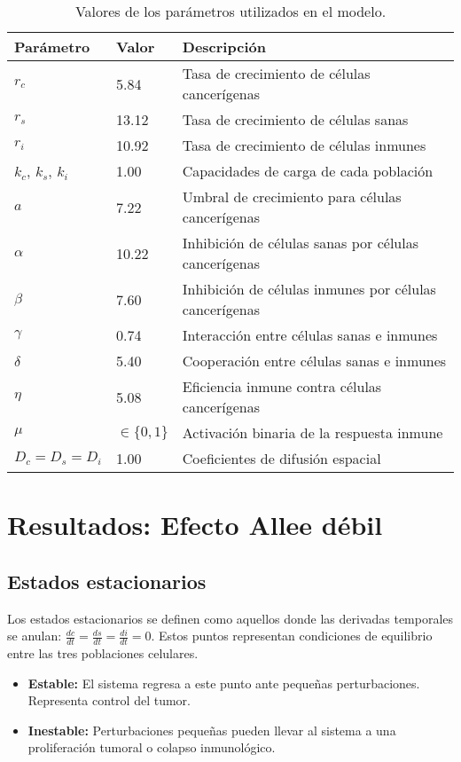 \documentclass{article}
\begin{document}
\begin{table}[H]
\centering
\begin{tabular}{lll}
\toprule
\textbf{Parámetro} & \textbf{Valor} & \textbf{Descripción} \\
\midrule
$r_c$ & 5.84 & Tasa de crecimiento de células cancerígenas \\
$r_s$ & 13.12 & Tasa de crecimiento de células sanas \\
$r_i$ & 10.92 & Tasa de crecimiento de células inmunes \\
$k_c$, $k_s$, $k_i$ & 1.00 & Capacidades de carga de cada población \\
$a$ & 7.22 & Umbral de crecimiento para células cancerígenas \\
$\alpha$ & 10.22 & Inhibición de células sanas por células cancerígenas \\
$\beta$ & 7.60 & Inhibición de células inmunes por células cancerígenas \\
$\gamma$ & 0.74 & Interacción entre células sanas e inmunes \\
$\delta$ & 5.40 & Cooperación entre células sanas e inmunes \\
$\eta$ & 5.08 & Eficiencia inmune contra células cancerígenas \\
$\mu$ & $\in \{0, 1\}$ & Activación binaria de la respuesta inmune \\
$D_c = D_s = D_i$ & 1.00 & Coeficientes de difusión espacial \\
\bottomrule
\end{tabular}
\caption{Valores de los parámetros utilizados en el modelo.}
\end{table}

\section{Resultados: Efecto Allee débil}

\subsection{Estados estacionarios}

Los estados estacionarios se definen como aquellos donde las derivadas temporales se anulan: $\frac{dc}{dt} = \frac{ds}{dt} = \frac{di}{dt} = 0$. Estos puntos representan condiciones de equilibrio entre las tres poblaciones celulares.

\begin{itemize}
\item \textbf{Estable:} El sistema regresa a este punto ante pequeñas perturbaciones. Representa control del tumor.
\item \textbf{Inestable:} Perturbaciones pequeñas pueden llevar al sistema a una proliferación tumoral o colapso inmunológico.
\end{itemize}
\end{document}
